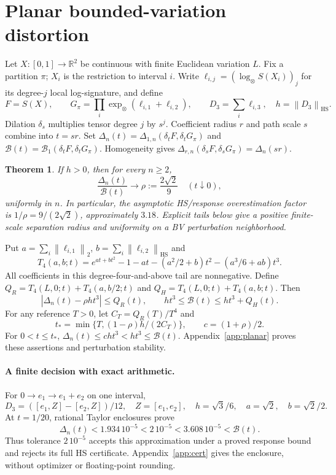 \documentclass[11pt,a4paper]{article}
\newtheorem{theorem}{Theorem}
\newcommand{\HS}{\mathrm{HS}}
\newcommand{\R}{\mathbb R}
\newcommand{\B}{\mathcal B}
\newcommand{\Del}{\Delta}
\newcommand{\norm}[1]{\left\lVert#1\right\rVert}
\begin{document}
\section{Planar bounded-variation distortion}
Let \(X:[0,1]\to\R^2\) be continuous with finite Euclidean variation \(L\).
Fix a partition \(\pi\); \(X_i\) is the restriction to interval \(i\).
Write \(\ell_{i,j}=(\log_\otimes S(X_i))_j\) for its degree-\(j\)
local log-signature, and define
\[
 F=S(X),\qquad G_\pi=\prod_i\exp_\otimes(\ell_{i,1}+\ell_{i,2}),\qquad
 D_3=\sum_i\ell_{i,3},\quad h=\norm{D_3}_{\HS}.
\]
Dilation \(\delta_s\) multiplies tensor degree \(j\) by \(s^j\).
Coefficient radius \(r\) and path scale \(s\) combine into \(t=sr\).
Set \(\Del_n(t)=\Del_{1,n}(\delta_t F,\delta_t G_\pi)\) and
\(\B(t)=\B_1(\delta_t F,\delta_t G_\pi)\).
Homogeneity gives \(\Del_{r,n}(\delta_sF,\delta_sG_\pi)=\Del_n(sr)\).

\begin{theorem}\label{thm:bv}
If \(h>0\), then for every \(n\ge2\),
\[
 \frac{\Del_n(t)}{\B(t)}\longrightarrow
 \rho:=\frac{2\sqrt2}{9}\quad(t\downarrow0),
\]
uniformly in \(n\). In particular, the asymptotic HS/response
overestimation factor is \(1/\rho=9/(2\sqrt2)\), approximately \(3.18\).
Explicit tails below give a positive finite-scale separation radius and
uniformity on a BV perturbation neighborhood.
\end{theorem}

Put \(a=\sum_i\norm{\ell_{i,1}}_2\), \(b=\sum_i\norm{\ell_{i,2}}_{\HS}\) and
\[
 T_4(a,b;t)=e^{at+bt^2}-1-at-(a^2/2+b)t^2-(a^3/6+ab)t^3.
\]
All coefficients in this degree-four-and-above tail are nonnegative.
Define \(Q_R=T_4(L,0;t)+T_4(a,b/2;t)\) and
\(Q_H=T_4(L,0;t)+T_4(a,b;t)\). Then
\begin{equation}\label{eq:tails}
 |\Del_n(t)-\rho ht^3|\le Q_R(t),\qquad
 ht^3\le\B(t)\le ht^3+Q_H(t).
\end{equation}
For any reference \(T>0\), let \(C_T=Q_R(T)/T^4\) and
\begin{equation}\label{eq:radius}
 t_*=\min\{T,(1-\rho)h/(2C_T)\},\qquad c=(1+\rho)/2.
\end{equation}
For \(0<t\le t_*\), \(\Del_n(t)\le cht^3<ht^3\le\B(t)\).
Appendix~\ref{app:planar} proves these assertions and perturbation stability.

\paragraph{A finite decision with exact arithmetic.}
For \(0\to e_1\to e_1+e_2\) on one interval,
\[
 D_3=([e_1,Z]-[e_2,Z])/12,\quad Z=[e_1,e_2],\quad
 h=\sqrt3/6,\quad a=\sqrt2,\quad b=\sqrt2/2.
\]
At \(t=1/20\), rational Taylor enclosures prove
\begin{equation}\label{eq:corner}
 \Del_n(t)<1.934\,10^{-5}<2\,10^{-5}<3.608\,10^{-5}<\B(t).
\end{equation}
Thus tolerance \(2\,10^{-5}\) accepts this approximation under a proved
response bound and rejects its full HS certificate. Appendix~\ref{app:cert}
gives the enclosure, without optimizer or floating-point rounding.
\end{document}
